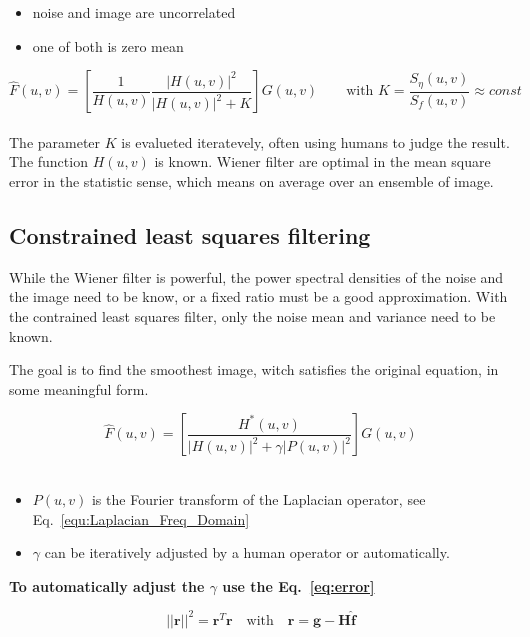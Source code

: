 \begin{itemize}
	\item noise and image are uncorrelated
	\item one of both is zero mean
\end{itemize}

\begin{equation}
	\hat{F}(u,v) = \left[ \frac{1}{H(u,v)} \frac{|H(u,v)|^2}{|H(u,v)|^2 +K} \right] G(u,v) \qquad \textrm{with } K = \frac{S_{\eta}(u,v)}{S_f(u,v)} \approx const
\end{equation}\\

The parameter $K$ is evalueted iteratevely, often using humans to judge the result. The function $H(u,v)$ is known.
 Wiener filter are optimal in the mean square error in the statistic sense, which means on average over an ensemble of image.

\subsection{Constrained least squares filtering }
While the Wiener filter is powerful, the power spectral densities of the noise and the image need to be know, or a fixed ratio must be a good approximation. With the contrained least squares filter, only the noise mean and variance need to be known.

The goal is to find the smoothest image, witch satisfies the original equation, in some meaningful form.
 
\begin{equation}
	\hat{F}(u,v) = \left[ \frac{H^*(u,v)}{|H(u,v)|^2 + \gamma |P(u,v)|^2} \right] G(u,v)
	\label{eq:ConstrainedFilter}
\end{equation}\\

\begin{itemize}
	\item $P(u,v)$ is the Fourier transform of the Laplacian operator, see  Eq.~\ref{equ:Laplacian_Freq_Domain}
	\item $\gamma$ can be iteratively adjusted by a human operator or automatically.
\end{itemize}

\textbf{To automatically adjust the $\gamma$ use the Eq.~\ref{eq:error}}

\begin{equation}
	||\mathbf{r}||^{2} = \mathbf{r}^{T}\mathbf{r} \quad \textrm{with} \quad\mathbf{r} = \mathbf{g}-\mathbf{H} \mathbf{\hat{f}}	
	\label{eq:rCalculate}
\end{equation}

